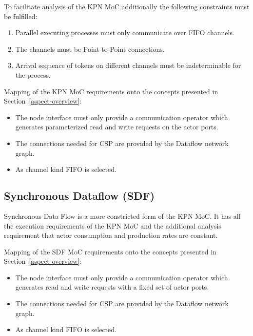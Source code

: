 To facilitate analysis of the KPN MoC additionally the following
constraints must be fulfilled:
\begin{enumerate}
\item Parallel executing processes must only communicate over FIFO channels.
\item The channels must be Point-to-Point connections.
\item Arrival sequence of tokens on different channels must be indeterminable
      for the process.
\end{enumerate}

Mapping of the KPN MoC requirements onto the concepts presented in
Section~\ref{aspect-overview}:

\begin{itemize}

\item The node interface must only provide a communication operator which
      generates parameterized read and write requests on the actor ports.

\item The connections needed for CSP are provided by the Dataflow network graph.

\item As channel kind FIFO is selected.

\end{itemize}

\subsection{Synchronous Dataflow (SDF)}
Synchronous Data Flow \cite{Lee87b:1987}
is a more constricted form of the KPN MoC.
It has all the execution requirements of the KPN MoC and
the additional analysis requirement that actor consumption and
production rates are constant.

Mapping of the SDF MoC requirements onto the concepts presented in
Section~\ref{aspect-overview}:

\begin{itemize}

\item The node interface must only provide a communication operator which
      generates read and write requests with a fixed set of actor ports.

\item The connections needed for CSP are provided by the Dataflow network graph.

\item As channel kind FIFO is selected.

\end{itemize}

